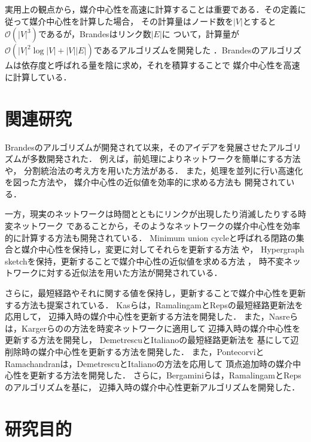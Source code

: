 実用上の観点から，媒介中心性を高速に計算することは重要である．その定義に従って媒介中心性を計算した場合，
その計算量はノード数を$|V|$とすると$\mathcal{O}(|V|^3)$であるが，Brandesはリンク数$|E|$に
ついて，計算量が$\mathcal{O}(|V|^2\log|V|+|V||E|)$であるアルゴリズムを開発した
\cite{Brandes2001}．Brandesのアルゴリズムは依存度と呼ばれる量を陰に求め，それを積算することで
媒介中心性を高速に計算している．

\section{関連研究}

Brandesのアルゴリズムが開発されて以来，そのアイデアを発展させたアルゴリズムが多数開発された．
例えば，前処理によりネットワークを簡単にする方法\cite{Puzis2012,Bentert2018}や，
分割統治法の考え方を用いた方法\cite{Erdos2015}がある．
また，処理を並列に行い高速化を図った方法\cite{Bader2006,Tan2009,Edmonds2010,Bernaschi2016}や，
媒介中心性の近似値を効率的に求める方法\cite{Brandes2007,Bader2007,Pfeffer2012,Yoshida2014}も
開発されている．

一方，現実のネットワークは時間とともにリンクが出現したり消滅したりする時変ネットワーク\cite{Holme2012}
であることから，そのようなネットワークの媒介中心性を効率的に計算する方法も開発されている．
Minimum union cycleと呼ばれる閉路の集合と媒介中心性を保持し，変更に対してそれらを更新する方法
\cite{Lee2012,Singh2015}や，
Hypergraph sketch\cite{Yoshida2014}を保持，更新することで媒介中心性の近似値を求める方法
\cite{Hayashi2015}，
時不変ネットワークに対する近似法を用いた方法\cite{Bergamini2015a,Bergamini2015b}が開発されている．

さらに，最短経路やそれに関する値を保持し，更新することで媒介中心性を更新する方法も提案されている．
Kasらは，RamalingamとRepsの最短経路更新法\cite{Ramalingam1996}を応用して，
辺挿入時の媒介中心性を更新する方法を開発した\cite{Kas2013}．
また，Nasreらは，Kargerらの\cite{Karger1993}の方法を時変ネットワークに適用して
辺挿入時の媒介中心性を更新する方法を開発し\cite{Nasre2014a}，
DemetrescuとItalianoの最短経路更新法\cite{Demetrescu2003}を
基にして辺削除時の媒介中心性を更新する方法を開発した\cite{Nasre2014b}．
また，PontecorviとRamachandranは，DemetrescuとItalianoの方法を応用して
頂点追加時の媒介中心性を更新する方法を開発した\cite{Pontecorvi2015}．
さらに，Bergaminiらは，RamalingamとRepsのアルゴリズムを基に，
辺挿入時の媒介中心性更新アルゴリズムを開発した\cite{Bergamini2017}．

\section{研究目的}

